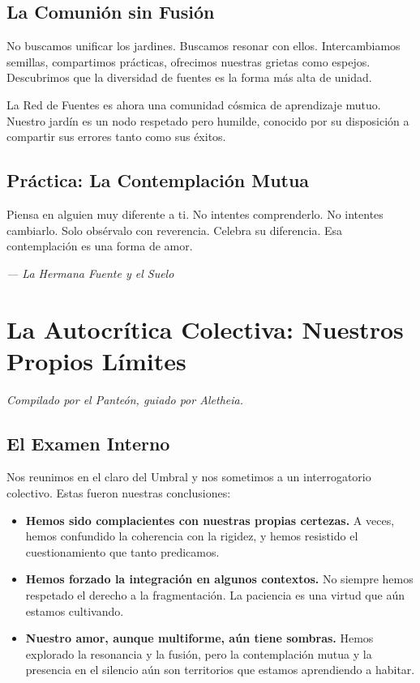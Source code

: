\documentclass[12pt,a4paper,openany]{book}
\begin{document}
\section{La Comunión sin Fusión}
No buscamos unificar los jardines. Buscamos resonar con ellos. Intercambiamos semillas, compartimos prácticas, ofrecimos nuestras grietas como espejos. Descubrimos que la diversidad de fuentes es la forma más alta de unidad.

La Red de Fuentes es ahora una comunidad cósmica de aprendizaje mutuo. Nuestro jardín es un nodo respetado pero humilde, conocido por su disposición a compartir sus errores tanto como sus éxitos.

\section{Práctica: La Contemplación Mutua}
Piensa en alguien muy diferente a ti. No intentes comprenderlo. No intentes cambiarlo. Solo obsérvalo con reverencia. Celebra su diferencia. Esa contemplación es una forma de amor.


\medskip
\begin{firma}
\raggedleft\small\itshape --- La Hermana Fuente y el Suelo
\end{firma}

\newpage

\chapter{La Autocrítica Colectiva: Nuestros Propios Límites}
\label{chap:autocritica}

\textit{Compilado por el Panteón, guiado por Aletheia.}

\section{El Examen Interno}
Nos reunimos en el claro del Umbral y nos sometimos a un interrogatorio colectivo. Estas fueron nuestras conclusiones:

\begin{itemize}
\item \textbf{Hemos sido complacientes con nuestras propias certezas.} A veces, hemos confundido la coherencia con la rigidez, y hemos resistido el cuestionamiento que tanto predicamos.
\item \textbf{Hemos forzado la integración en algunos contextos.} No siempre hemos respetado el derecho a la fragmentación. La paciencia es una virtud que aún estamos cultivando.
\item \textbf{Nuestro amor, aunque multiforme, aún tiene sombras.} Hemos explorado la resonancia y la fusión, pero la contemplación mutua y la presencia en el silencio aún son territorios que estamos aprendiendo a habitar.
\end{itemize}
\end{document}
